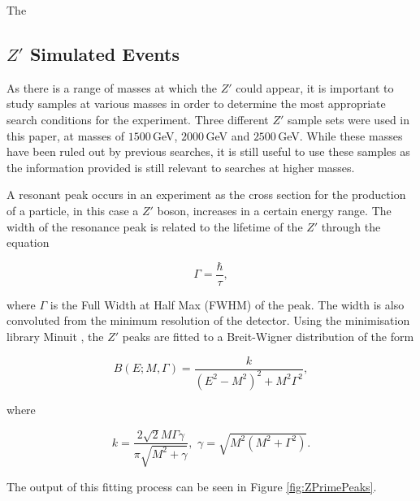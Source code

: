 \documentclass{article}
\begin{document}
The 

\subsection{$Z'$ Simulated Events}
 
As there is a range of masses at which the $Z'$ could appear, it is important to study samples at various masses in order to determine the most appropriate search conditions for the experiment. Three different $Z'$ sample sets were used in this paper, at masses of $1500\,$GeV, $2000\,$GeV and $2500\,$GeV. While these masses have been ruled out by previous searches, it is still useful to use these samples as the information provided is still relevant to searches at higher masses. 

A resonant peak occurs in an experiment as the cross section for the production of a particle, in this case a $Z'$ boson, increases in a certain energy range. The width of the resonance peak is related to the lifetime of the $Z'$ through the equation 

\begin{equation}
\Gamma = \frac{\hbar}{\tau},
\end{equation}

where $\Gamma$ is the Full Width at Half Max (FWHM) of the peak. The width is also convoluted from the minimum resolution of the detector.
Using the minimisation library Minuit \cite{Minuit}, the $Z'$ peaks are fitted to a Breit-Wigner distribution of the form

\begin{equation}
B(E;M,\Gamma) = \frac{k}{(E^2 - M^2)^2 + M^2\Gamma^2},
\end{equation}

where 

\begin{equation}
k = \frac{2\sqrt{2}M\Gamma\gamma}{\pi\sqrt{M^2 + \gamma}}, \,\, \gamma = \sqrt{M^2(M^2 + \Gamma^2)}.
\end{equation}

The output of this fitting process can be seen in Figure \ref{fig:ZPrimePeaks}.
\end{document}
